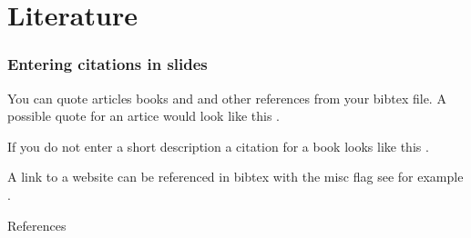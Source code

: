 \section{Literature}

    \begin{frame}
        \frametitle{Entering citations in slides}
        You can quote articles books and and other references from your bibtex file. A possible quote for an artice would look like this \cite[Non-cooperative Games]{nash51}.
        
        If you do not enter a short description a citation for a book looks like this \cite{hawking1988}.

        A link to a website can be referenced in bibtex with the misc flag see for example \cite{CitekeyMisc}.
    \end{frame}

    \begin{frame}[allowframebreaks]{References} 
		
		
    \end{frame}